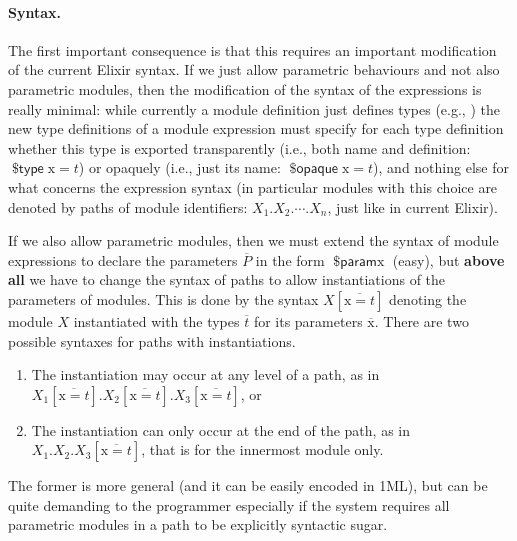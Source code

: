 \documentclass[a4paper,10pt]{article}
\DeclareMathOperator{\kwprm}{\textsf{\$param}}
\DeclareMathOperator{\kwopq}{\textsf{\$opaque}}
\DeclareMathOperator{\kwtp}{\textsf{\$type}}
\newcommand{\tx}{\textrm{x}}
\begin{document}
\paragraph{Syntax.} The first important consequence is that this requires an important modification of the current Elixir syntax. If we just allow parametric behaviours and not also parametric modules, then the modification of the syntax of the expressions is really minimal: while currently a module definition just defines types (e.g., ) the new type definitions of a module expression must specify for each type definition whether this type is exported transparently (i.e., both name and definition: $\kwtp \tx = t$) or opaquely (i.e., just its name: $\kwopq \tx = t$), and nothing else for what concerns the expression syntax (in particular modules with this choice are denoted by paths of module identifiers: $X_1.X_2.\cdots{.}X_n$, just like in current Elixir).

If we also allow parametric modules, then we must extend the syntax of module expressions to declare the parameters $\overline P$ in the form $\kwprm \tx$ (easy), but \textbf{above all} we have to change the syntax of paths to allow instantiations of the parameters of modules. This is done by the syntax $X[\overline{\tx=t}]$ denoting the module $X$ instantiated with the types $\overline{t}$ for its parameters $\overline{\tx}$. 
There are two possible syntaxes for paths with instantiations.
\begin{enumerate}
\item The instantiation may occur at any level of a path, as in $X_1[\overline{\tx=t}].X_2[\overline{\tx=t}].X_3[\overline{\tx=t}]$, or
\item The instantiation can only occur at the end of the path, as in $X_1.X_2.X_3[\overline{\tx=t}]$, that is for the innermost module only.
\end{enumerate}
 The former is more general (and it can be easily encoded in 1ML), but can be quite demanding to the programmer especially if the system requires all parametric modules in a path to be explicitly syntactic sugar.
\end{document}
